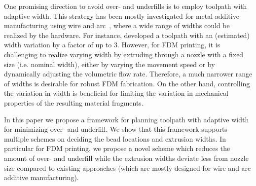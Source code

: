 One promising direction to avoid over- and underfills is to employ toolpath with adaptive width. 
This strategy has been mostly investigated for metal additive manufacturing using wire and arc~\cite{Ding2014}, where a wide range of widths could be realized by the hardware. 
For instance, \citeauthor{Ding2016a} developed a toolpath with an (estimated) width variation by a factor of up to $3$.
However, for FDM printing, it is challenging to realize varying width by extruding through a nozzle with a fixed size (i.e. nominal width), either by varying the movement speed or by dynamically adjusting the volumetric flow rate. 
Therefore, a much narrower range of widths is desirable for robust FDM fabrication.
On the other hand, controlling the variation in width is beneficial for limiting the variation in mechanical properties of the resulting material fragments. 

In this paper we propose a framework for planning toolpath with adaptive width for minimizing over- and underfill. 
We show that this framework supports multiple schemes on deciding the bead locations and extrusion widths. 
In particular for FDM printing, we propose a novel scheme which reduces the amount of over- and underfill while the extrusion widths deviate less from nozzle size compared to existing approaches (which are mostly designed for wire and arc additive manufacturing). 


